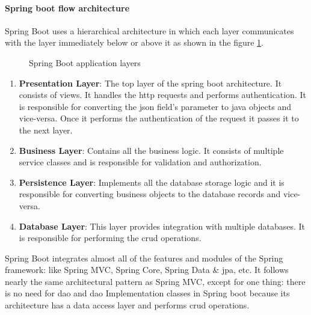 \paragraph{Spring boot flow architecture} \mbox{} \newline \newline
Spring Boot uses a hierarchical architecture in which each layer communicates with the layer immediately
below or above it as shown in the figure \ref{layers}. \\

\begin{figure}[hbt!]
      \centering
      
      \caption{Spring Boot application layers}
      \label{layers}
\end{figure}

\begin{enumerate}
      \item \textbf{Presentation Layer}: The top layer of the spring boot architecture. It consists of views.
            It handles the \acrshort{http} requests and performs authentication. It is responsible for converting the \acrfull{json}
            field’s parameter to java objects and vice-versa. Once it performs the authentication of the request
            it passes it to the next layer.
      \item \textbf{Business Layer}: Contains all the business logic. It consists of multiple service classes
            and is responsible for validation and authorization.
      \item \textbf{Persistence Layer}: Implements all the database storage logic and it is responsible for
            converting business objects to the database records and vice-versa.
      \item \textbf{Database Layer}: This layer provides integration with multiple databases. It is
            responsible for performing the \acrshort{crud} operations.
\end{enumerate}

\noindent Spring Boot integrates almost all of the features and modules of the Spring framework: like Spring MVC,
Spring Core, Spring Data \& \acrshort{jpa}, etc. It follows nearly the same architectural pattern as
Spring MVC, except for one thing: there is no need for \acrfull{dao} and \acrshort{dao} Implementation
classes in Spring boot because its architecture has a data access layer and performs \acrshort{crud}
operations. \\


